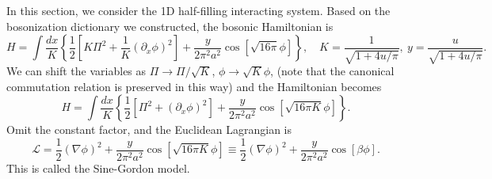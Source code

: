 \documentclass[aps,prb,superscriptaddress,nofootinbib]{revtex4}
\begin{document}
In this section, we consider the 1D half-filling interacting system.
Based on the bosonization dictionary we constructed, the bosonic Hamiltonian is
\begin{equation*}
	H = \int \frac{dx}{K} \left\{ \frac{1}{2}\left[K \Pi^2 + \frac{1}{K}(\partial_x\phi)^2 \right] + \frac{y}{2\pi^2 a^2} \cos\left[\sqrt{16\pi}\phi\right] \right\},\quad
	K = \frac{1}{\sqrt{1+4u/\pi}}, \ y = \frac{u}{\sqrt{1+4u/\pi}}.
\end{equation*}
We can shift the variables as $\Pi \rightarrow \Pi/\sqrt K$, $\phi \rightarrow \sqrt K \phi$,
(note that the canonical commutation relation is preserved in this way) and the Hamiltonian becomes
\begin{equation*}
	H = \int \frac{dx}{K} \left\{ \frac{1}{2}\left[\Pi^2 + (\partial_x\phi)^2 \right] + \frac{y}{2\pi^2 a^2} \cos\left[\sqrt{16\pi K}\phi\right] \right\}.
\end{equation*}
Omit the constant factor, and the Euclidean Lagrangian is
\begin{equation}
	\mathcal L = \frac{1}{2}(\nabla \phi)^2 + \frac{y}{2\pi^2 a^2} \cos\left[\sqrt{16\pi K}\phi\right]
	\equiv \frac{1}{2}(\nabla \phi)^2 + \frac{y}{2\pi^2 a^2} \cos\left[\beta\phi\right].
\end{equation}
This is called the Sine-Gordon model.
\end{document}
